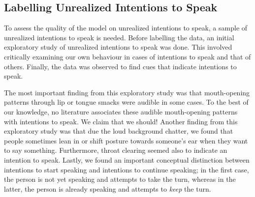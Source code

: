 \documentclass[manuscript,screen,review]{acmart}
\begin{document}
\subsection{Labelling Unrealized Intentions to Speak}
\label{sec:annot}
To assess the quality of the model on unrealized intentions to speak, a sample of unrealized intentions to speak is needed. Before labelling the data, an initial exploratory study of unrealized intentions to speak was done. This involved critically examining our own behaviour in cases of intentions to speak and that of others. Finally, the data was observed to find cues that indicate intentions to speak. 


The most important finding from this exploratory study was that mouth-opening patterns through lip or tongue smacks were audible in some cases. To the best of our knowledge, no literature associates these audible mouth-opening patterns with intentions to speak. We claim that we should! Another finding from this exploratory study was that due the loud background chatter, we found that people sometimes lean in or shift posture towards someone's ear when they want to say something. Furthermore, throat clearing seemed also to indicate an intention to speak. Lastly, we found an important conceptual distinction between intentions to start speaking and intentions to continue speaking; in the first case, the person is not yet speaking and attempts to take the turn, whereas in the latter, the person is already speaking and attempts to \emph{keep} the turn. 
\end{document}
